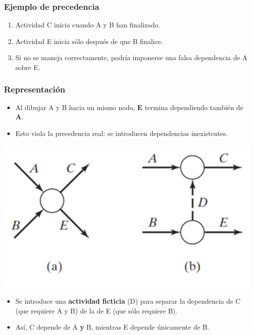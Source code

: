 \documentclass{beamer}
\begin{document}
\begin{frame}
\frametitle{Ejemplo de precedencia}

\begin{enumerate}
    \item Actividad C inicia cuando A y B han finalizado.
    \item Actividad E inicia sólo después de que B finalice.
    \item Si no se maneja correctamente, podría imponerse una falsa dependencia de A sobre E.
\end{enumerate}

\end{frame}

\begin{frame}
\frametitle{Representación}

\begin{itemize}
    \item Al dibujar A y B hacia un mismo nodo, \textbf{E} termina dependiendo también de \textbf{A}.
    \item Esto viola la precedencia real: se introducen dependencias inexistentes.
\end{itemize}

\begin{center}
\includegraphics[scale=0.4]{images/actividad_concurrente.png}
\end{center}
\vspace{-1cm}
\begin{itemize}
    \item Se introduce una \textbf{actividad ficticia} (D) para separar la dependencia de C (que requiere A y B) de la de E (que sólo requiere B).
    \item Así, C depende de A \textbf{y} B, mientras E depende únicamente de B.
\end{itemize}

\end{frame}
\end{document}
